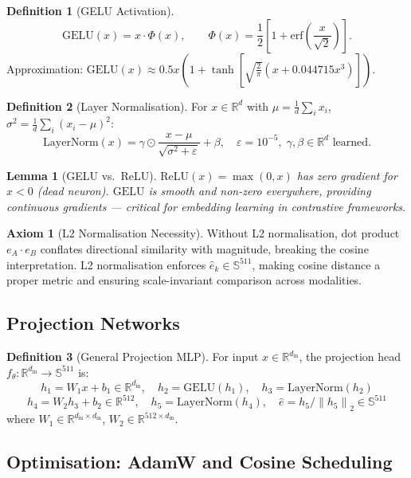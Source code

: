 \documentclass[12pt,a4paper]{article}
\theoremstyle{definition}
\newtheorem{definition}{Definition}[section]
\newtheorem{axiom}{Axiom}[section]
\theoremstyle{plain}
\newtheorem{lemma}[theorem]{Lemma}
\theoremstyle{remark}
\newcommand{\R}{\mathbb{R}}
\newcommand{\Sph}{\mathbb{S}}
\newcommand{\Norm}[1]{\left\|#1\right\|}
\newcommand{\LN}{\mathrm{LayerNorm}}
\newcommand{\GELU}{\mathrm{GELU}}
\begin{document}
\begin{definition}[GELU Activation]
\[
  \GELU(x) = x \cdot \Phi(x), \qquad \Phi(x) = \frac{1}{2}\left[1 + \text{erf}\!\left(\frac{x}{\sqrt{2}}\right)\right].
\]
Approximation: $\GELU(x) \approx 0.5x\!\left(1 + \tanh\!\left[\sqrt{\tfrac{2}{\pi}}\left(x + 0.044715x^3\right)\right]\right)$.
\end{definition}

\begin{definition}[Layer Normalisation]
For $x \in \R^d$ with $\mu = \frac{1}{d}\sum_i x_i$, $\sigma^2 = \frac{1}{d}\sum_i (x_i - \mu)^2$:
\[
  \LN(x) = \gamma \odot \frac{x - \mu}{\sqrt{\sigma^2 + \varepsilon}} + \beta, \quad \varepsilon = 10^{-5},\; \gamma, \beta \in \R^d \text{ learned.}
\]
\end{definition}

\begin{lemma}[GELU vs.\ ReLU]
$\text{ReLU}(x) = \max(0,x)$ has zero gradient for $x < 0$ (dead neuron). $\GELU$ is smooth and non-zero everywhere, providing continuous gradients --- critical for embedding learning in contrastive frameworks.
\end{lemma}

\begin{axiom}[L2 Normalisation Necessity]
Without L2 normalisation, dot product $e_A \cdot e_B$ conflates directional similarity with magnitude, breaking the cosine interpretation. L2 normalisation enforces $\hat{e}_k \in \Sph^{511}$, making cosine distance a proper metric and ensuring scale-invariant comparison across modalities.
\end{axiom}

\subsection{Projection Networks}

\begin{definition}[General Projection MLP]
\label{def:projmlp}
For input $x \in \R^{d_{\text{in}}}$, the projection head $f_\theta : \R^{d_{\text{in}}} \to \Sph^{511}$ is:
\[
  h_1 = W_1 x + b_1 \in \R^{d_{\text{in}}}, \quad h_2 = \GELU(h_1), \quad h_3 = \LN(h_2)
\]
\[
  h_4 = W_2 h_3 + b_2 \in \R^{512}, \quad h_5 = \LN(h_4), \quad \hat{e} = h_5 / \Norm{h_5}_2 \in \Sph^{511}
\]
where $W_1 \in \R^{d_{\text{in}} \times d_{\text{in}}}$, $W_2 \in \R^{512 \times d_{\text{in}}}$.
\end{definition}

\subsection{Optimisation: AdamW and Cosine Scheduling}
\end{document}
